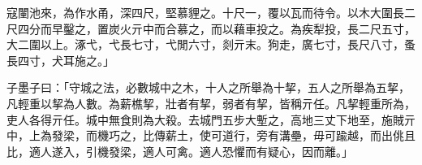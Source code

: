 \begin{pinyinscope}
寇闉池來，為作水甬，深四尺，堅慕貍之。十尺一，覆以瓦而待令。以木大圍長二尺四分而早鑿之，置炭火亓中而合慕之，而以藉車投之。為疾犁投，長二尺五寸，大二圍以上。涿弋，弋長七寸，弋閒六寸，剡亓末。狗走，廣七寸，長尺八寸，蚤長四寸，犬耳施之。」

子墨子曰：「守城之法，必數城中之木，十人之所舉為十挈，五人之所舉為五挈，凡輕重以挈為人數。為薪樵挈，壯者有挈，弱者有挈，皆稱亓任。凡挈輕重所為，吏人各得亓任。城中無食則為大殺。去城門五步大塹之，高地三丈下地至，施賊亓中，上為發梁，而機巧之，比傳薪土，使可道行，旁有溝壘，毋可踰越，而出佻且比，適人遂入，引機發梁，適人可禽。適人恐懼而有疑心，因而離。」


\end{pinyinscope}